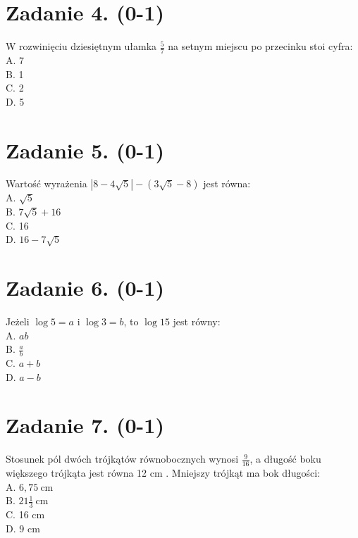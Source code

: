 \documentclass[10pt]{article}
\begin{document}
\section*{Zadanie 4. (0-1)}
W rozwinięciu dziesiętnym ułamka \(\frac{5}{7}\) na setnym miejscu po przecinku stoi cyfra:\\
A. 7\\
B. 1\\
C. 2\\
D. 5

\section*{Zadanie 5. (0-1)}
Wartość wyrażenia \(|8-4 \sqrt{5}|-(3 \sqrt{5}-8)\) jest równa:\\
A. \(\sqrt{5}\)\\
B. \(7 \sqrt{5}+16\)\\
C. 16\\
D. \(16-7 \sqrt{5}\)

\section*{Zadanie 6. (0-1)}
Jeżeli \(\log 5=a\) i \(\log 3=b\), to \(\log 15\) jest równy:\\
A. \(a b\)\\
B. \(\frac{a}{b}\)\\
C. \(a+b\)\\
D. \(a-b\)

\section*{Zadanie 7. (0-1)}
Stosunek pól dwóch trójkątów równobocznych wynosi \(\frac{9}{16}\), a długość boku większego trójkąta jest równa 12 cm . Mniejszy trójkąt ma bok długości:\\
A. \(6,75 \mathrm{~cm}\)\\
B. \(21 \frac{1}{3} \mathrm{~cm}\)\\
C. 16 cm\\
D. 9 cm
\end{document}
